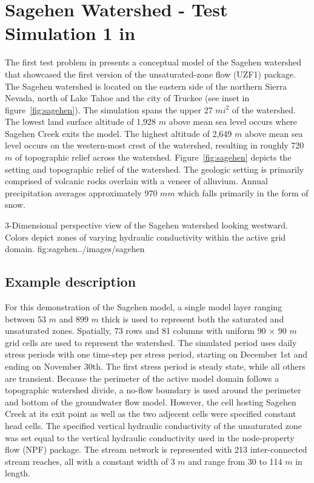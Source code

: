 \section{Sagehen Watershed - Test Simulation 1 in \cite{UZF}}

The first test problem in \cite{UZF} presents a conceptual model of the Sagehen watershed that showcased the first version of the unsaturated-zone flow (UZF1) package. The Sagehen watershed is located on the eastern side of the northern Sierra Nevada, north of Lake Tahoe and the city of Truckee (see inset in figure~\ref{fig:sagehen}). The simulation spans the upper 27 $mi^2$ of the watershed.  The lowest land surface altitude of 1,928 $m$ above mean sea level occurs where Sagehen Creek exits the model.  The highest altitude of 2,649 $m$ above mean sea level occurs on the western-most crest of the watershed, resulting in roughly 720 $m$ of topographic relief across the watershed.  Figure~\ref{fig:sagehen} depicts the setting and topographic relief of the watershed. The geologic setting is primarily comprised of volcanic rocks overlain with a veneer of alluvium. Annual precipitation averages approximately 970 $mm$ which falls primarily in the form of snow.  

\begin{StandardFigure}
	{3-Dimensional perspective view of the Sagehen watershed looking westward.  Colors depict zones of varying hydraulic conductivity within the active grid domain.}
	{fig:sagehen}{../images/sagehen}
\end{StandardFigure}

\subsection{Example description}

For this \mf demonstration of the Sagehen model, a single model layer ranging between 53 $m$ and 899 $m$ thick is used to represent both the saturated and unsaturated zones.  Spatially, 73 rows and 81 columns with uniform 90 $\times$ 90 $m$ grid cells are used to represent the watershed.  The simulated period uses daily stress periods with one time-step per stress period, starting on December 1st and ending on November 30th.  The first stress period is steady state, while all others are transient.  Because the perimeter of the active model domain follows a topographic watershed divide, a no-flow boundary is used around the perimeter and bottom of the groundwater flow model.  However, the cell hosting Sagehen Creek at its exit point as well as the two adjecent cells were specified constant head cells.  The specified vertical hydraulic conductivity of the unsaturated zone was set equal to the vertical hydraulic conductivity used in the node-property flow (NPF) package. The stream network is represented with 213 inter-connected stream reaches, all with a constant width of 3 $m$ and range from 30 to 114 $m$ in length.  


